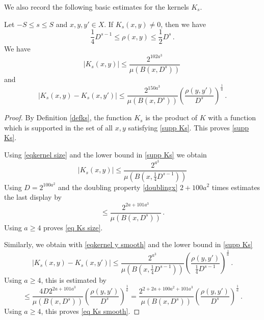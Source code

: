 We also record the following basic estimates for the kernels $K_s$.

\begin{lemma}\label{kernel summand}
    Let $-S\le s\le S$ and $x,y,y'\in X$.
    If $K_s(x,y)\neq 0$, then we have
    \begin{equation}\label{supp Ks}
      \frac{1}{4} D^{s-1} \leq \rho(x,y) \leq \frac{1}{2} D^s\, .
    \end{equation}
    We have
    \begin{equation}
       \label{eq Ks size}
        |K_s(x,y)|\le \frac{2^{102 a^3}}{\mu(B(x, D^{s}))}\,
    \end{equation}
    and \begin{equation}
        \label{eq Ks smooth}
        |K_s(x,y)-K_s(x, y')|\le \frac{2^{150a^3}}{\mu(B(x, D^{s}))}
        \left(\frac{ \rho(y,y')}{D^s}\right)^{\frac 1a}\,.
    \end{equation}
\end{lemma}

\begin{proof}
    By Definition \eqref{defks}, the function $K_s$ is the product of
    $K$ with a function which is supported in the set of all
    $x,y$ satisfying \eqref{supp Ks}. This proves
    \eqref{supp Ks}.

    Using \eqref{eqkernel size} and the lower bound in \eqref{supp Ks}
    we obtain
    \begin{equation}
        |K_s(x,y)|\le \frac{2^{a^3}}{\mu(B(x,\frac 14 D^{s-1}))}
    \end{equation}
    Using $D=2^{100a^2}$
    and the doubling property \eqref{doublingx} $2 +100a^2$ times estimates
    the last display by
    \begin{equation}
        \label{eq Ks aux}
        \le \frac{2^{2a+101a^3}}{\mu(B(x,  D^{s}))}\, .
    \end{equation}
    Using $a\ge 4$ proves \eqref{eq Ks size}.


    Similarly, we obtain with  \eqref{eqkernel y smooth} and the lower bound in
    \eqref{supp Ks}
    \begin{equation}
        |K_s(x,y)-K_s(x, y')|\le \frac{2^{a^3}}{\mu(B(x, \frac 14 D^{s-1}))}
        \left(\frac{ \rho(y,y')}{\frac 14 D^{s-1}}\right)^{\frac 1a}\,.
    \end{equation}
    Using $a \ge 4$, this is estimated by
    \begin{equation}
       \le \frac{4D 2^{2a+101a^3}}{\mu(B(x,  D^{s}))}
        \left(\frac{ \rho(y,y')}{D^{s}}\right)^{\frac 1a}
         = \frac{2^{2+2a+100a^2+101a^3}}{\mu(B(x,  D^{s}))}
        \left(\frac{ \rho(y,y')}{D^{s}}\right)^{\frac 1a}\,.
    \end{equation}
    Using $a\ge 4$, this proves  \eqref{eq Ks smooth}.
\end{proof}


